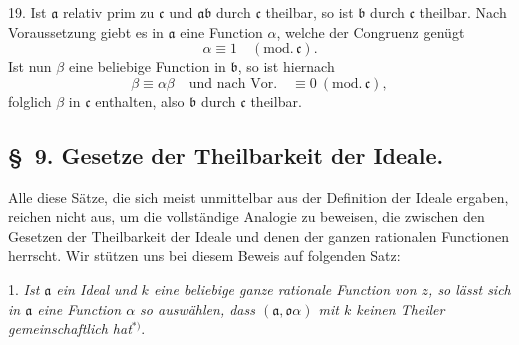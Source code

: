 \documentclass{article}
\begin{document}
19. Ist $\mathfrak{a}$ relativ prim zu $\mathfrak{c}$ und $\mathfrak{a}\mathfrak{b}$ durch $\mathfrak{c}$ theilbar, so ist $\mathfrak{b}$ durch $\mathfrak{c}$ theilbar. Nach Voraussetzung giebt es in $\mathfrak{a}$ eine Function $\alpha$, welche der Congruenz genügt
\[ \alpha \equiv 1 \quad (\text{mod.}\,\mathfrak{c}). \]
Ist nun $\beta$ eine beliebige Function in $\mathfrak{b}$, so ist hiernach
\[ \beta \equiv \alpha\beta \quad \text{und nach Vor.} \quad \equiv 0 \ (\text{mod.}\,\mathfrak{c}), \]
folglich $\beta$ in $\mathfrak{c}$ enthalten, also $\mathfrak{b}$ durch $\mathfrak{c}$ theilbar.

\subsection*{§~9. Gesetze der Theilbarkeit der Ideale.}

Alle diese Sätze, die sich meist unmittelbar aus der Definition der Ideale ergaben, reichen nicht aus, um die vollständige Analogie zu beweisen, die zwischen den Gesetzen der Theilbarkeit der Ideale und denen der ganzen rationalen Functionen herrscht. Wir stützen uns bei diesem Beweis auf folgenden Satz:


1. \emph{Ist $\mathfrak{a}$ ein Ideal und $k$ eine beliebige ganze rationale Function von $z$, so lässt sich in $\mathfrak{a}$ eine Function $\alpha$ so auswählen, dass $(\mathfrak{a}, \mathfrak{o}\alpha)$ mit $k$ keinen Theiler gemeinschaftlich hat}${}^{*)}$.
\end{document}
